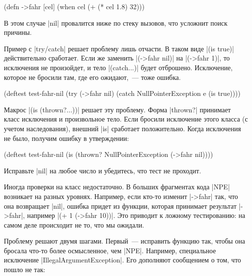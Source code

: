 \begin{english}
  \begin{clojure}
(defn ->fahr [cel]
  (when cel
    (+ (* cel 1.8) 32)))
  \end{clojure}
\end{english}

В этом случае \spverb|nil| провалится ниже по стеку вызовов, что усложнит поиск
причины.

Пример с \spverb|try/catch| решает проблему лишь отчасти. В таком виде
\spverb|(is true)| действительно сработает. Если же заменить \spverb|(->fahr nil)|
на \spverb|(->fahr 1)|, то исключения не произойдет, и тело \spverb|(catch...)|
будет отброшено. Исключение, которое не бросили там, где его ожидают,~--- тоже ошибка.

\begin{english}
  \begin{clojure}
(deftest test-fahr-nil
  (try
    (->fahr nil)
    (catch NullPointerException e
      (is true))))
  \end{clojure}
\end{english}

Макрос \spverb|(is (thrown?...))| решает эту проблему. Форма \spverb|thrown?|
принимает класс исключения и произвольное тело. Если бросили исключение этого
класса (с учетом наследования), внешний \spverb|is| сработает
положительно. Когда исключения не было, получим ошибку в утверждении:

\begin{english}
  \begin{clojure}
(deftest test-fahr-nil
  (is (thrown? NullPointerException
               (->fahr nil))))
  \end{clojure}
\end{english}

Исправьте \spverb|nil| на любое число и убедитесь, что тест не проходит.

Иногда проверки на класс недостаточно. В больших фрагментах кода \spverb|NPE|
возникает на разных уровнях. Например, если кто-то изменит \spverb|->fahr| так,
что она возвращает \spverb|nil|, ошибка придет из функции, которая принимает
результат \spverb|->fahr|, например \spverb|(+ 1 (->fahr 10))|. Это приводит к
ложному тестированию: на самом деле происходит не то, что мы ожидали.

Проблему решают двумя шагами. Первый~--- исправить функцию так, чтобы она
бросала что-то более осмысленное, чем \spverb|NPE|. Например, специальное
исключение \spverb|IllegalArgumentException|. Его дополняют сообщением о том,
что пошло не так:

